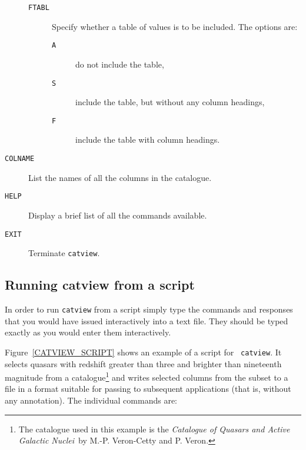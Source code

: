 \documentclass[twoside,11pt]{article}
\renewcommand{\_}{\texttt{\symbol{95}}}
\begin{document}
\begin{description}
\begin{description}
    \item[ {\tt FTABL} ] Specify whether a table of values is to be 
     included. The options are:

    \begin{description}

      \item[ {\tt A} ] do not include the table,

      \item[ {\tt S} ] include the table, but without any column
       headings,

      \item[ {\tt F} ] include the table with column headings.

    \end{description}

  \end{description}


  \item[ {\tt COLNAME} ] List the names of all the columns in the
   catalogue.

  \item[ {\tt HELP} ] Display a brief list of all the commands
   available.

  \item[ {\tt EXIT} ] Terminate {\tt catview}.

\end{description}


\subsection{\label{VIEW_SCRIPT}Running catview from a script}

In order to run {\tt catview} from a script simply type the commands and
responses that you would have issued interactively into a text file.
They should be typed exactly as you would enter them interactively.

Figure~\ref{CATVIEW_SCRIPT} shows an example of a script for {\tt
catview}. It selects quasars with redshift greater than three and
brighter than nineteenth magnitude from a catalogue\footnote{The
catalogue used in this example is the {\it Catalogue of Quasars and Active 
Galactic Nuclei}\, by M.-P. Veron-Cetty and P. Veron\cite{VERON89}.}
and writes selected columns from the subset to a file in a format suitable
for passing to subsequent applications (that is, without any annotation).
The individual commands are:
\end{document}
